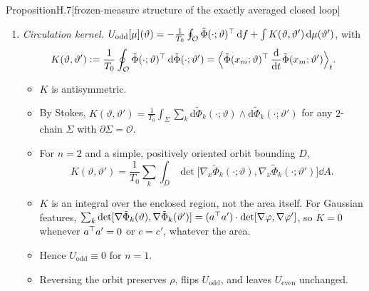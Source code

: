 \begin{thm}{Proposition}{H.7}[frozen-measure structure of the exactly averaged closed loop]
\begin{enumerate}[label=(\alph*)]
  \item \emph{Circulation kernel.}
    $U_{\mathrm{odd}}[\mu](\vartheta) = -\frac{1}{T_0}\oint_{\mathcal{O}}\tilde\Phi(\cdot;\vartheta)^\top\,\mathrm{d} f
      + \int K(\vartheta,\vartheta')\,\mathrm{d}\mu(\vartheta')$, with
    \begin{equation}\label{eq:finitegain:K}
      K(\vartheta,\vartheta') := \frac{1}{T_0}\oint_{\mathcal{O}}\tilde\Phi(\cdot;\vartheta)^\top\,\mathrm{d}\tilde\Phi(\cdot;\vartheta')
        = \Bigl\langle\tilde\Phi(x_m;\vartheta)^\top\,\frac{\mathrm{d}}{\mathrm{d}t}\tilde\Phi(x_m;\vartheta')\Bigr\rangle_t .
    \end{equation}
    \begin{itemize}
      \item $K$ is antisymmetric.
      \item By Stokes,
        $K(\vartheta,\vartheta') = \frac{1}{T_0}\int_\Sigma\sum_k\mathrm{d}\tilde\Phi_k(\cdot;\vartheta)\wedge
        \mathrm{d}\tilde\Phi_k(\cdot;\vartheta')$ for any $2$-chain $\Sigma$ with $\partial\Sigma=\mathcal{O}$.
      \item For $n=2$ and a simple, positively oriented orbit bounding $D$,
        \[
          K(\vartheta,\vartheta') = \frac{1}{T_0}\sum_k\int_D\det\bigl[\nabla_x\tilde\Phi_k(\cdot;\vartheta),
          \nabla_x\tilde\Phi_k(\cdot;\vartheta')\bigr]\dd A.
        \]
      \item $K$ is an integral over the enclosed region, not the area itself. For Gaussian features,
        $\sum_k\det[\nabla\tilde\Phi_k(\vartheta),\nabla\tilde\Phi_k(\vartheta')]
        = (a^\top a')\cdot\det[\nabla\varphi,\nabla\varphi']$, so $K=0$ whenever $a^\top a'=0$ or $c=c'$, whatever the
        area.
      \item Hence $U_{\mathrm{odd}}\equiv0$ for $n=1$.
      \item Reversing the orbit preserves $\rho$, flips $U_{\mathrm{odd}}$, and leaves $U_{\mathrm{even}}$ unchanged.
    \end{itemize}


\end{enumerate}
\end{thm}
